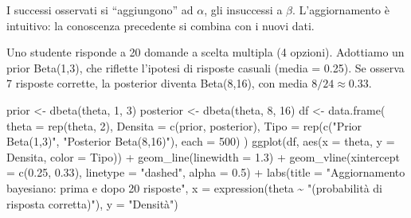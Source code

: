 \documentclass[
  italian,
  letterpaper,
  a4paper,
  11pt,
  open=any]{scrbook}
\newenvironment{Shaded}{\begin{snugshade}}{\end{snugshade}}
\newcommand{\AttributeTok}[1]{\textcolor[rgb]{0.40,0.45,0.13}{#1}}
\newcommand{\DecValTok}[1]{\textcolor[rgb]{0.68,0.00,0.00}{#1}}
\newcommand{\FloatTok}[1]{\textcolor[rgb]{0.68,0.00,0.00}{#1}}
\newcommand{\FunctionTok}[1]{\textcolor[rgb]{0.28,0.35,0.67}{#1}}
\newcommand{\NormalTok}[1]{\textcolor[rgb]{0.00,0.23,0.31}{#1}}
\newcommand{\OtherTok}[1]{\textcolor[rgb]{0.00,0.23,0.31}{#1}}
\newcommand{\SpecialCharTok}[1]{\textcolor[rgb]{0.37,0.37,0.37}{#1}}
\newcommand{\StringTok}[1]{\textcolor[rgb]{0.13,0.47,0.30}{#1}}
\theoremstyle{plain}
\theoremstyle{definition}
\theoremstyle{definition}
\theoremstyle{remark}
\begin{document}
I successi osservati si ``aggiungono'' ad \(\alpha\), gli insuccessi a
\(\beta\). L'aggiornamento è intuitivo: la conoscenza precedente si
combina con i nuovi dati.

\begin{tcolorbox}[enhanced jigsaw, arc=.35mm, bottomrule=.15mm, bottomtitle=1mm, breakable, colback=white, colbacktitle=quarto-callout-note-color!10!white, colframe=quarto-callout-note-color-frame, coltitle=black, left=2mm, leftrule=.75mm, opacityback=0, opacitybacktitle=0.6, rightrule=.15mm, title=\textcolor{quarto-callout-note-color}{\faInfo}\hspace{0.5em}{Esempio: test a scelta multipla}, titlerule=0mm, toprule=.15mm, toptitle=1mm]

Uno studente risponde a 20 domande a scelta multipla (4 opzioni).
Adottiamo un prior Beta(1,3), che riflette l'ipotesi di risposte casuali
(media = 0.25). Se osserva 7 risposte corrette, la posterior diventa
Beta(8,16), con media \(8/24 \approx 0.33\).

\begin{Shaded}
\begin{Highlighting}[]
\NormalTok{prior }\OtherTok{\textless{}{-}} \FunctionTok{dbeta}\NormalTok{(theta, }\DecValTok{1}\NormalTok{, }\DecValTok{3}\NormalTok{)}
\NormalTok{posterior }\OtherTok{\textless{}{-}} \FunctionTok{dbeta}\NormalTok{(theta, }\DecValTok{8}\NormalTok{, }\DecValTok{16}\NormalTok{)}
\NormalTok{df }\OtherTok{\textless{}{-}} \FunctionTok{data.frame}\NormalTok{(}
  \AttributeTok{theta =} \FunctionTok{rep}\NormalTok{(theta, }\DecValTok{2}\NormalTok{),}
  \AttributeTok{Densita =} \FunctionTok{c}\NormalTok{(prior, posterior),}
  \AttributeTok{Tipo =} \FunctionTok{rep}\NormalTok{(}\FunctionTok{c}\NormalTok{(}\StringTok{"Prior Beta(1,3)"}\NormalTok{, }\StringTok{"Posterior Beta(8,16)"}\NormalTok{), }\AttributeTok{each =} \DecValTok{500}\NormalTok{)}
\NormalTok{)}
\FunctionTok{ggplot}\NormalTok{(df, }\FunctionTok{aes}\NormalTok{(}\AttributeTok{x =}\NormalTok{ theta, }\AttributeTok{y =}\NormalTok{ Densita, }\AttributeTok{color =}\NormalTok{ Tipo)) }\SpecialCharTok{+}
  \FunctionTok{geom\_line}\NormalTok{(}\AttributeTok{linewidth =} \FloatTok{1.3}\NormalTok{) }\SpecialCharTok{+}
  \FunctionTok{geom\_vline}\NormalTok{(}\AttributeTok{xintercept =} \FunctionTok{c}\NormalTok{(}\FloatTok{0.25}\NormalTok{, }\FloatTok{0.33}\NormalTok{), }\AttributeTok{linetype =} \StringTok{"dashed"}\NormalTok{, }\AttributeTok{alpha =} \FloatTok{0.5}\NormalTok{) }\SpecialCharTok{+}
  \FunctionTok{labs}\NormalTok{(}\AttributeTok{title =} \StringTok{"Aggiornamento bayesiano: prima e dopo 20 risposte"}\NormalTok{,}
       \AttributeTok{x =} \FunctionTok{expression}\NormalTok{(theta }\SpecialCharTok{\textasciitilde{}} \StringTok{"(probabilità di risposta corretta)"}\NormalTok{),}
       \AttributeTok{y =} \StringTok{"Densità"}\NormalTok{)}
\end{Highlighting}
\end{Shaded}


\end{tcolorbox}
\end{document}
